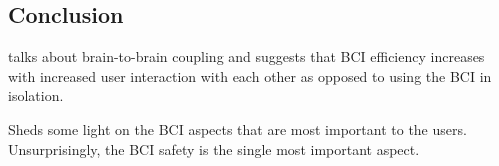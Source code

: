 \documentclass[fleqn,11pt]{olplainarticle}
\begin{document}
\subsection{Conclusion}
\cite{sexton2015overlooked} talks about brain-to-brain coupling and suggests that BCI efficiency increases with increased user interaction with each other as opposed to using the BCI in isolation.

\cite{kawala2021summary} Sheds some light on the BCI aspects that are most important to the users. Unsurprisingly, the BCI safety is the single most important aspect.

\printbibliography
\end{document}
